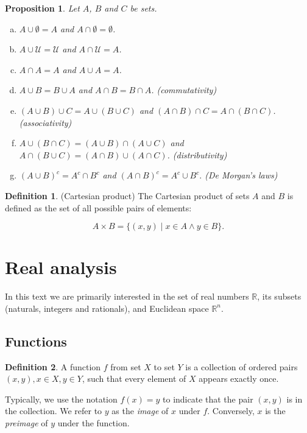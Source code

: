 \documentclass{book}
\theoremstyle{plain}%
\newtheorem{proposition}{Proposition}[section]
\theoremstyle{definition}
\newtheorem{definition}{Definition}[section]
\begin{document}
\begin{appendices}
\begin{proposition} Let $A$, $B$ and $C$ be sets.
\begin{enumerate}[(a)]
\item $A \cup \emptyset = A$ and $A \cap \emptyset = \emptyset$.
\item $A \cup \mathcal{U} = \mathcal{U}$ and $A \cap \mathcal{U} = A$.
\item $A \cap A = A$ and $A \cup A = A$.
\item $A \cup B = B \cup A$ and $A \cap B = B \cap A$. (commutativity)
\item $(A \cup B) \cup C = A \cup (B \cup C)$ and $(A \cap B) \cap C = A \cap (B \cap C)$. (associativity)
\item $A \cup (B \cap C) = (A \cup B) \cap (A \cup C)$ and $A \cap (B \cup C) = (A \cap B) \cup (A \cap C)$. (distributivity)
\item $(A \cup B)^c = A^c \cap B^c$ and $(A \cap B)^c = A^c \cup B^c.$ (De Morgan's laws)
\end{enumerate}
\end{proposition}

\begin{definition}(Cartesian product) The Cartesian product of sets $A$ and $B$ is defined as the set of all possible pairs of elements:

$$A \times B = \{(x,y) \mid x \in A \wedge y \in B\}.$$
\end{definition}

\section{Real analysis}

In this text we are primarily interested in the set of real numbers $\mathbb{R}$, its subsets (naturals, integers and rationals), and Euclidean space $\mathbb{R}^n$.

\subsection*{Functions}

\begin{definition} A function $f$ from set $X$ to set $Y$ is a collection of ordered pairs $(x, y), x \in X, y \in Y$, such that every element of $X$ appears exactly once.

Typically, we use the notation $f(x) = y$ to indicate that the pair $(x,y)$ is in the collection. We refer to $y$ as the \textit{image} of $x$ under $f$. Conversely, $x$ is the \emph{preimage} of $y$ under the function.


\end{definition}
\end{appendices}
\end{document}
